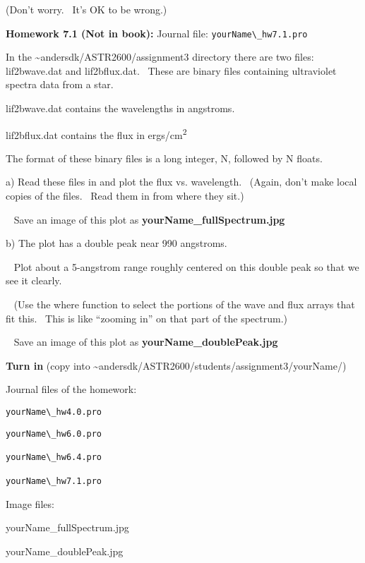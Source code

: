 \documentclass{article}
\begin{document}
\begin{spacing}{1.0}
(Don't worry.~ It's OK to be wrong.)


\textbf{Homework 7.1 (Not in book):} Journal file: \verb|yourName\_hw7.1.pro|

In the \textasciitilde{}andersdk/ASTR2600/assignment3 directory there
are two files: lif2bwave.dat and lif2bflux.dat.~ These are binary files
containing ultraviolet spectra data from a star.

lif2bwave.dat contains the wavelengths in angstroms.

lif2bflux.dat contains the flux in ergs/cm\textsuperscript{2}

The format of these binary files is a long integer, N, followed by N
floats.

a) Read these files in and plot the flux vs. wavelength.~ (Again, don't
make local copies of the files.~ Read them in from where they sit.)

~ Save an image of this plot as \textbf{yourName\_fullSpectrum.jpg}

b) The plot has a double peak near 990 angstroms. ~

~ Plot about a 5-angstrom range roughly centered on this double peak so
that we see it clearly.

~ (Use the where function to select the portions of the wave and flux
arrays that fit this.~ This is like ``zooming in'' on that part of the
spectrum.)

~ Save an image of this plot as \textbf{yourName\_doublePeak.jpg}


\textbf{Turn in} (copy into
\textasciitilde{}andersdk/ASTR2600/students/assignment3/yourName/)

Journal files of the homework:

\verb|yourName\_hw4.0.pro|

\verb|yourName\_hw6.0.pro|

\verb|yourName\_hw6.4.pro|~

\verb|yourName\_hw7.1.pro|~

Image files:\textbf{~}

yourName\_fullSpectrum.jpg

yourName\_doublePeak.jpg




\end{spacing}
\end{document}
